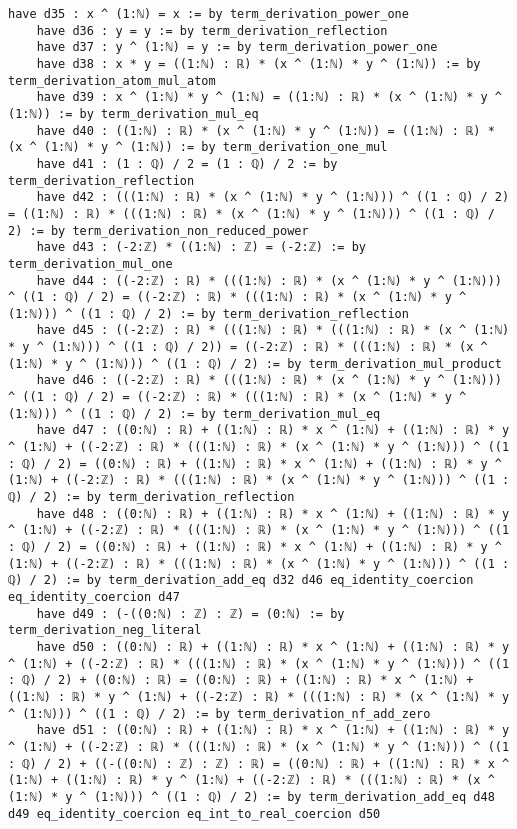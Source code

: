 \documentclass{article}
\begin{document}
\begin{tcolorbox}[colback=white!10, width=\linewidth]
\begin{lstlisting}[language=Lean4]
    have d35 : x ^ (1:ℕ) = x := by term_derivation_power_one
    have d36 : y = y := by term_derivation_reflection
    have d37 : y ^ (1:ℕ) = y := by term_derivation_power_one
    have d38 : x * y = ((1:ℕ) : ℝ) * (x ^ (1:ℕ) * y ^ (1:ℕ)) := by term_derivation_atom_mul_atom
    have d39 : x ^ (1:ℕ) * y ^ (1:ℕ) = ((1:ℕ) : ℝ) * (x ^ (1:ℕ) * y ^ (1:ℕ)) := by term_derivation_mul_eq
    have d40 : ((1:ℕ) : ℝ) * (x ^ (1:ℕ) * y ^ (1:ℕ)) = ((1:ℕ) : ℝ) * (x ^ (1:ℕ) * y ^ (1:ℕ)) := by term_derivation_one_mul
    have d41 : (1 : ℚ) / 2 = (1 : ℚ) / 2 := by term_derivation_reflection
    have d42 : (((1:ℕ) : ℝ) * (x ^ (1:ℕ) * y ^ (1:ℕ))) ^ ((1 : ℚ) / 2) = ((1:ℕ) : ℝ) * (((1:ℕ) : ℝ) * (x ^ (1:ℕ) * y ^ (1:ℕ))) ^ ((1 : ℚ) / 2) := by term_derivation_non_reduced_power
    have d43 : (-2:ℤ) * ((1:ℕ) : ℤ) = (-2:ℤ) := by term_derivation_mul_one
    have d44 : ((-2:ℤ) : ℝ) * (((1:ℕ) : ℝ) * (x ^ (1:ℕ) * y ^ (1:ℕ))) ^ ((1 : ℚ) / 2) = ((-2:ℤ) : ℝ) * (((1:ℕ) : ℝ) * (x ^ (1:ℕ) * y ^ (1:ℕ))) ^ ((1 : ℚ) / 2) := by term_derivation_reflection
    have d45 : ((-2:ℤ) : ℝ) * (((1:ℕ) : ℝ) * (((1:ℕ) : ℝ) * (x ^ (1:ℕ) * y ^ (1:ℕ))) ^ ((1 : ℚ) / 2)) = ((-2:ℤ) : ℝ) * (((1:ℕ) : ℝ) * (x ^ (1:ℕ) * y ^ (1:ℕ))) ^ ((1 : ℚ) / 2) := by term_derivation_mul_product
    have d46 : ((-2:ℤ) : ℝ) * (((1:ℕ) : ℝ) * (x ^ (1:ℕ) * y ^ (1:ℕ))) ^ ((1 : ℚ) / 2) = ((-2:ℤ) : ℝ) * (((1:ℕ) : ℝ) * (x ^ (1:ℕ) * y ^ (1:ℕ))) ^ ((1 : ℚ) / 2) := by term_derivation_mul_eq
    have d47 : ((0:ℕ) : ℝ) + ((1:ℕ) : ℝ) * x ^ (1:ℕ) + ((1:ℕ) : ℝ) * y ^ (1:ℕ) + ((-2:ℤ) : ℝ) * (((1:ℕ) : ℝ) * (x ^ (1:ℕ) * y ^ (1:ℕ))) ^ ((1 : ℚ) / 2) = ((0:ℕ) : ℝ) + ((1:ℕ) : ℝ) * x ^ (1:ℕ) + ((1:ℕ) : ℝ) * y ^ (1:ℕ) + ((-2:ℤ) : ℝ) * (((1:ℕ) : ℝ) * (x ^ (1:ℕ) * y ^ (1:ℕ))) ^ ((1 : ℚ) / 2) := by term_derivation_reflection
    have d48 : ((0:ℕ) : ℝ) + ((1:ℕ) : ℝ) * x ^ (1:ℕ) + ((1:ℕ) : ℝ) * y ^ (1:ℕ) + ((-2:ℤ) : ℝ) * (((1:ℕ) : ℝ) * (x ^ (1:ℕ) * y ^ (1:ℕ))) ^ ((1 : ℚ) / 2) = ((0:ℕ) : ℝ) + ((1:ℕ) : ℝ) * x ^ (1:ℕ) + ((1:ℕ) : ℝ) * y ^ (1:ℕ) + ((-2:ℤ) : ℝ) * (((1:ℕ) : ℝ) * (x ^ (1:ℕ) * y ^ (1:ℕ))) ^ ((1 : ℚ) / 2) := by term_derivation_add_eq d32 d46 eq_identity_coercion eq_identity_coercion d47
    have d49 : (-((0:ℕ) : ℤ) : ℤ) = (0:ℕ) := by term_derivation_neg_literal
    have d50 : ((0:ℕ) : ℝ) + ((1:ℕ) : ℝ) * x ^ (1:ℕ) + ((1:ℕ) : ℝ) * y ^ (1:ℕ) + ((-2:ℤ) : ℝ) * (((1:ℕ) : ℝ) * (x ^ (1:ℕ) * y ^ (1:ℕ))) ^ ((1 : ℚ) / 2) + ((0:ℕ) : ℝ) = ((0:ℕ) : ℝ) + ((1:ℕ) : ℝ) * x ^ (1:ℕ) + ((1:ℕ) : ℝ) * y ^ (1:ℕ) + ((-2:ℤ) : ℝ) * (((1:ℕ) : ℝ) * (x ^ (1:ℕ) * y ^ (1:ℕ))) ^ ((1 : ℚ) / 2) := by term_derivation_nf_add_zero
    have d51 : ((0:ℕ) : ℝ) + ((1:ℕ) : ℝ) * x ^ (1:ℕ) + ((1:ℕ) : ℝ) * y ^ (1:ℕ) + ((-2:ℤ) : ℝ) * (((1:ℕ) : ℝ) * (x ^ (1:ℕ) * y ^ (1:ℕ))) ^ ((1 : ℚ) / 2) + ((-((0:ℕ) : ℤ) : ℤ) : ℝ) = ((0:ℕ) : ℝ) + ((1:ℕ) : ℝ) * x ^ (1:ℕ) + ((1:ℕ) : ℝ) * y ^ (1:ℕ) + ((-2:ℤ) : ℝ) * (((1:ℕ) : ℝ) * (x ^ (1:ℕ) * y ^ (1:ℕ))) ^ ((1 : ℚ) / 2) := by term_derivation_add_eq d48 d49 eq_identity_coercion eq_int_to_real_coercion d50

\end{lstlisting}
\end{tcolorbox}
\end{document}
